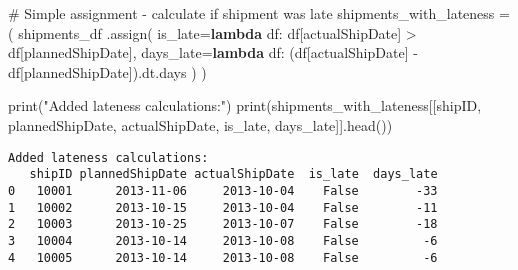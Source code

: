 \documentclass[
  letterpaper,
  DIV=11,
  numbers=noendperiod]{scrartcl}
\newenvironment{Shaded}{\begin{snugshade}}{\end{snugshade}}
\newcommand{\BuiltInTok}[1]{\textcolor[rgb]{0.00,0.23,0.31}{#1}}
\newcommand{\CommentTok}[1]{\textcolor[rgb]{0.37,0.37,0.37}{#1}}
\newcommand{\KeywordTok}[1]{\textcolor[rgb]{0.00,0.23,0.31}{\textbf{#1}}}
\newcommand{\NormalTok}[1]{\textcolor[rgb]{0.00,0.23,0.31}{#1}}
\newcommand{\OperatorTok}[1]{\textcolor[rgb]{0.37,0.37,0.37}{#1}}
\newcommand{\StringTok}[1]{\textcolor[rgb]{0.13,0.47,0.30}{#1}}
\begin{document}
\label{mental-model-1-assign}
\begin{Shaded}
\begin{Highlighting}[]
\CommentTok{\# Simple assignment {-} calculate if shipment was late}
\NormalTok{shipments\_with\_lateness }\OperatorTok{=}\NormalTok{ (}
\NormalTok{    shipments\_df}
\NormalTok{    .assign(}
\NormalTok{        is\_late}\OperatorTok{=}\KeywordTok{lambda}\NormalTok{ df: df[}\StringTok{\textquotesingle{}actualShipDate\textquotesingle{}}\NormalTok{] }\OperatorTok{\textgreater{}}\NormalTok{ df[}\StringTok{\textquotesingle{}plannedShipDate\textquotesingle{}}\NormalTok{],}
\NormalTok{        days\_late}\OperatorTok{=}\KeywordTok{lambda}\NormalTok{ df: (df[}\StringTok{\textquotesingle{}actualShipDate\textquotesingle{}}\NormalTok{] }\OperatorTok{{-}}\NormalTok{ df[}\StringTok{\textquotesingle{}plannedShipDate\textquotesingle{}}\NormalTok{]).dt.days}
\NormalTok{    )}
\NormalTok{)}

\BuiltInTok{print}\NormalTok{(}\StringTok{"Added lateness calculations:"}\NormalTok{)}
\BuiltInTok{print}\NormalTok{(shipments\_with\_lateness[[}\StringTok{\textquotesingle{}shipID\textquotesingle{}}\NormalTok{, }\StringTok{\textquotesingle{}plannedShipDate\textquotesingle{}}\NormalTok{, }\StringTok{\textquotesingle{}actualShipDate\textquotesingle{}}\NormalTok{, }\StringTok{\textquotesingle{}is\_late\textquotesingle{}}\NormalTok{, }\StringTok{\textquotesingle{}days\_late\textquotesingle{}}\NormalTok{]].head())}
\end{Highlighting}
\end{Shaded}

\begin{verbatim}
Added lateness calculations:
   shipID plannedShipDate actualShipDate  is_late  days_late
0   10001      2013-11-06     2013-10-04    False        -33
1   10002      2013-10-15     2013-10-04    False        -11
2   10003      2013-10-25     2013-10-07    False        -18
3   10004      2013-10-14     2013-10-08    False         -6
4   10005      2013-10-14     2013-10-08    False         -6
\end{verbatim}
\end{document}
